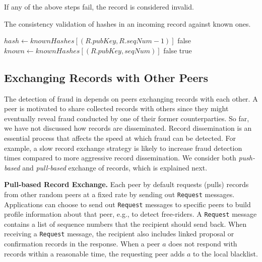 If any of the above steps fail, the record is considered invalid.

\begin{algorithm}[t]
	\caption{The consistency validation of hashes in an incoming record against known ones.}
	\label{alg:record_validation_step4}
	\begin{algorithmic}[1]
		
		  
		\State $ hash \leftarrow knownHashes[(R.pubKey, R.seqNum - 1)] $
		\State \Return false
		\EndIf
		\State
		\State $ known \leftarrow knownHashes[(R.pubKey, seqNum)] $
		\State \Return false
		\EndIf
		\EndFor
		\State \Return true
		\EndProcedure
		
	\end{algorithmic}
\end{algorithm}

\subsection{Exchanging Records with Other Peers}
\label{sec:exchanging_records}
The detection of fraud in \TrustChain{} depends on peers exchanging records with each other.
A peer is motivated to share collected records with others since they might eventually reveal fraud conducted by one of their former counterparties.
So far, we have not discussed how records are disseminated.
Record dissemination is an essential process that affects the speed at which fraud can be detected.
For example, a slow record exchange strategy is likely to increase fraud detection times compared to more aggressive record dissemination.
We consider both \emph{push-based} and \emph{pull-based} exchange of records, which is explained next.

\textbf{Pull-based Record Exchange.}
Each peer by default requests (pulls) records from other random peers at a fixed rate by sending out \texttt{Request} messages.
Applications can choose to send out \texttt{Request} messages to specific peers to build profile information about that peer, e.g., to detect free-riders.
A \texttt{Request} message contains a list of sequence numbers that the recipient should send back.
When receiving a \texttt{Request} message, the recipient also includes linked proposal or confirmation records in the response.
When a peer $ a $ does not respond with records within a reasonable time, the requesting peer adds $ a $ to the local blacklist.

